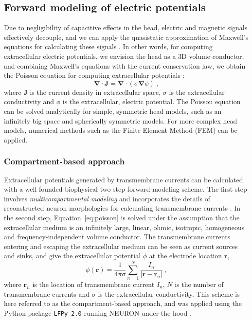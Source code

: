 \documentclass[preprint,10pt,authoryear]{elsarticle}
\newcommand{\hlp}[2][Purple]{ {\sethlcolor{#1} \hl{#2}} }
\newcommand{\gen}[1]{\color{white}{\hlp{GTE: #1 }}\color{black}}
\begin{document}
\subsection{Forward modeling of electric potentials}
Due to negligibility of capacitive effects in the head, electric and magnetic signals effectively decouple, and we can apply the quasistatic approximation of Maxwell's equations for calculating these signals \citep{HAMALAINEN1993,NUNEZ2006}. In other words, for computing extracellular electric potentials, we envision the head as a 3D volume conductor, and combining Maxwell's equations with the current conservation law, we obtain the Poisson equation for computing extracellular potentials \cite{GRIFFITHS1999}:
\begin{equation} \label{eq:poisson}
\mathbf{\nabla} \cdot \mathbf{J} = \mathbf{\nabla}  \cdot (\sigma \mathbf{\nabla} \phi)~,
\end{equation}
where $\mathbf{J}$ is the current density in extracellular space, $\sigma$ is the extracellular conductivity and $\phi$ is the extracellular, electric potential.
The Poisson equation can be solved analytically for simple, symmetric head models, such as an infinitely big space and spherically symmetric models. For more complex head models, numerical methods such as the Finite Element Method (FEM) can be applied.

\subsubsection{Compartment-based approach}\label{subsubsec:multicomp}
Extracellular potentials generated by transmembrane currents can be calculated with a well-founded biophysical two-step forward-modeling scheme. The first step involves \textit{multicompartmental modeling} and incorporates the details of reconstructed neuron morphologies for calculating transmembrane currents \citep{STERRATT2011}. In the second step, Equation~\eqref{eq:poisson} is solved under the assumption that the extracellular medium is an infinitely large, linear, ohmic, isotropic, homogeneous and frequency-independent volume conductor. The transmembrane currents entering and escaping the extracellular medium can be seen as current sources and sinks, and give the extracellular potential $\phi$ at the electrode location $\mathbf{r}$,
\begin{equation}
\phi(\mathbf{r}) = \frac{1}{4 \pi \sigma}\sum_{n=1}^N \frac{I_n}{|\mathbf{r} - \mathbf{r}_n|}~,
\label{eq:point_source}
\end{equation}
where $\mathbf{r}_n$ is the location of transmembrane current $I_n$, $N$ is the number of transmembrane currents and $\sigma$ is the extracellular conductivity. 
This scheme is here referred to as the compartment-based approach, and was applied using the Python package \texttt{LFPy 2.0} running NEURON under the hood \citep{HAGEN2018,CARNEVALE2006}.
\end{document}
